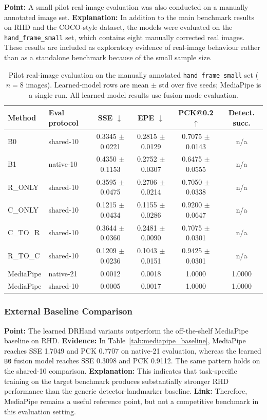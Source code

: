 \documentclass[10pt,letterpaper]{article}
\begin{document}
\medskip
\noindent\textbf{Point:} A small pilot real-image evaluation was also conducted on a manually annotated image set.  
\textbf{Explanation:} In addition to the main benchmark results on RHD and the COCO-style dataset, the models were evaluated on the \texttt{hand\_frame\_small} set, which contains eight manually corrected real images. These results are included as exploratory evidence of real-image behaviour rather than as a standalone benchmark because of the small sample size.

\begin{table}[t]
\centering
\footnotesize
\caption{Pilot real-image evaluation on the manually annotated \texttt{hand\_frame\_small} set ($n=8$ images). Learned-model rows are mean $\pm$ std over five seeds; MediaPipe is a single run. All learned-model results use fusion-mode evaluation.}
\label{tab:hand_frame_small_pilot}
\begin{tabular}{llcccc}
\toprule
Method & Eval protocol & SSE $\downarrow$ & EPE $\downarrow$ & PCK@0.2 $\uparrow$ & Detect. succ. \\
\midrule
B0 & shared-10 & 0.3345 $\pm$ 0.0221 & 0.2815 $\pm$ 0.0129 & 0.7075 $\pm$ 0.0143 & n/a \\
B1 & native-10 & 0.4350 $\pm$ 0.1153 & 0.2752 $\pm$ 0.0307 & 0.6475 $\pm$ 0.0555 & n/a \\
R\_ONLY & shared-10 & 0.3595 $\pm$ 0.0475 & 0.2706 $\pm$ 0.0214 & 0.7050 $\pm$ 0.0338 & n/a \\
C\_ONLY & shared-10 & 0.1215 $\pm$ 0.0434 & 0.1155 $\pm$ 0.0286 & 0.9200 $\pm$ 0.0647 & n/a \\
C\_TO\_R & shared-10 & 0.3644 $\pm$ 0.0360 & 0.2481 $\pm$ 0.0090 & 0.7075 $\pm$ 0.0301 & n/a \\
R\_TO\_C & shared-10 & 0.1209 $\pm$ 0.0236 & 0.1043 $\pm$ 0.0151 & 0.9425 $\pm$ 0.0301 & n/a \\
MediaPipe & native-21 & 0.0012 & 0.0018 & 1.0000 & 1.0000 \\
MediaPipe & shared-10 & 0.0005 & 0.0017 & 1.0000 & 1.0000 \\
\bottomrule
\end{tabular}
\end{table}

\subsubsection{External Baseline Comparison}

\medskip
\noindent\textbf{Point:} The learned DRHand variants outperform the off-the-shelf MediaPipe baseline on RHD.  
\textbf{Evidence:} In Table~\ref{tab:mediapipe_baseline}, MediaPipe reaches SSE 1.7049 and PCK 0.7707 on native-21 evaluation, whereas the learned \texttt{B0} fusion model reaches SSE 0.3098 and PCK 0.9112. The same pattern holds on the shared-10 comparison.  
\textbf{Explanation:} This indicates that task-specific training on the target benchmark produces substantially stronger RHD performance than the generic detector-landmarker baseline.  
\textbf{Link:} Therefore, MediaPipe remains a useful reference point, but not a competitive benchmark in this evaluation setting.
\end{document}
